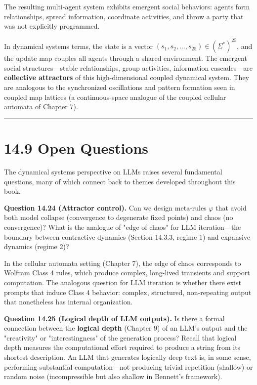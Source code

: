 The resulting multi-agent system exhibits emergent social behaviors: agents form relationships, spread information, coordinate activities, and throw a party that was not explicitly programmed.

In dynamical systems terms, the state is a vector $(s_1, s_2, \ldots, s_{25}) \in (\Sigma^*)^{25}$, and the update map couples all agents through a shared environment. The emergent social structures---stable relationships, group activities, information cascades---are \textbf{collective attractors} of this high-dimensional coupled dynamical system. They are analogous to the synchronized oscillations and pattern formation seen in coupled map lattices (a continuous-space analogue of the coupled cellular automata of Chapter 7).

\bigskip\hrule\bigskip

\section{14.9 Open Questions}

The dynamical systems perspective on LLMs raises several fundamental questions, many of which connect back to themes developed throughout this book.

\textbf{Question 14.24 (Attractor control).} Can we design meta-rules $\varphi$ that avoid both model collapse (convergence to degenerate fixed points) and chaos (no convergence)? What is the analogue of "edge of chaos" for LLM iteration---the boundary between contractive dynamics (Section 14.3.3, regime 1) and expansive dynamics (regime 2)?

In the cellular automata setting (Chapter 7), the edge of chaos corresponds to Wolfram Class 4 rules, which produce complex, long-lived transients and support computation. The analogous question for LLM iteration is whether there exist prompts that induce Class 4 behavior: complex, structured, non-repeating output that nonetheless has internal organization.

\textbf{Question 14.25 (Logical depth of LLM outputs).} Is there a formal connection between the \textbf{logical depth} (Chapter 9) of an LLM's output and the "creativity" or "interestingness" of the generation process? Recall that logical depth measures the computational effort required to produce a string from its shortest description. An LLM that generates logically deep text is, in some sense, performing substantial computation---not producing trivial repetition (shallow) or random noise (incompressible but also shallow in Bennett's framework).

